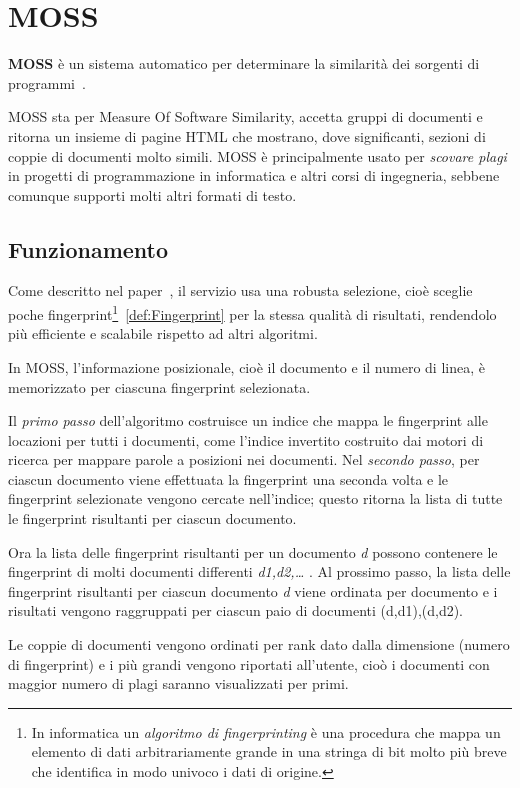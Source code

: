 	\section{MOSS}\label{def:MOSS}	
		\textbf{MOSS} è un sistema automatico per determinare la similarità dei sorgenti di programmi~\citep{AikenMOSS}. 
		
		MOSS sta per Measure Of Software Similarity, accetta gruppi di documenti e ritorna un insieme di pagine HTML che mostrano, dove significanti, sezioni di coppie di documenti molto simili. MOSS è principalmente usato per \textit{scovare plagi} in progetti di programmazione in informatica e altri corsi di ingegneria, sebbene comunque supporti molti altri formati di testo. 
		
		\subsection[Funzionamento]{Funzionamento}
			Come descritto nel paper~\citep{Clough2000}, il servizio usa una robusta selezione, cioè sceglie poche fingerprint\footnote{In informatica un \textit{algoritmo di fingerprinting} è una procedura che mappa un elemento di dati arbitrariamente grande in una stringa di bit molto più breve che identifica in modo univoco i dati di origine.}~\ref{def:Fingerprint} per la stessa qualità di risultati, rendendolo più efficiente e scalabile rispetto ad altri algoritmi.
			
			In MOSS, l'informazione posizionale, cioè il documento e il numero di linea, è memorizzato per ciascuna fingerprint selezionata.
			
			Il \textit{primo passo} dell'algoritmo costruisce un indice che mappa le fingerprint alle locazioni per tutti i documenti, come l'indice invertito costruito dai motori di ricerca per mappare parole a posizioni nei documenti.
			Nel \textit{secondo passo}, per ciascun documento viene effettuata la fingerprint una seconda volta e le fingerprint selezionate vengono cercate nell'indice; questo ritorna la lista di tutte le fingerprint risultanti per ciascun documento. 
			
			Ora la lista delle fingerprint risultanti per un documento \textit{d} possono contenere le fingerprint di molti documenti differenti \textit{ d1,d2,… }.
			Al prossimo passo, la lista delle fingerprint risultanti per ciascun documento \textit{d} viene ordinata per documento e i risultati vengono raggruppati per ciascun paio di documenti (d,d1),(d,d2). 
			
			Le coppie di documenti vengono ordinati per rank dato dalla dimensione (numero di fingerprint) e i più grandi vengono riportati all'utente, cioò i documenti con maggior numero di plagi saranno visualizzati per primi. 
			
